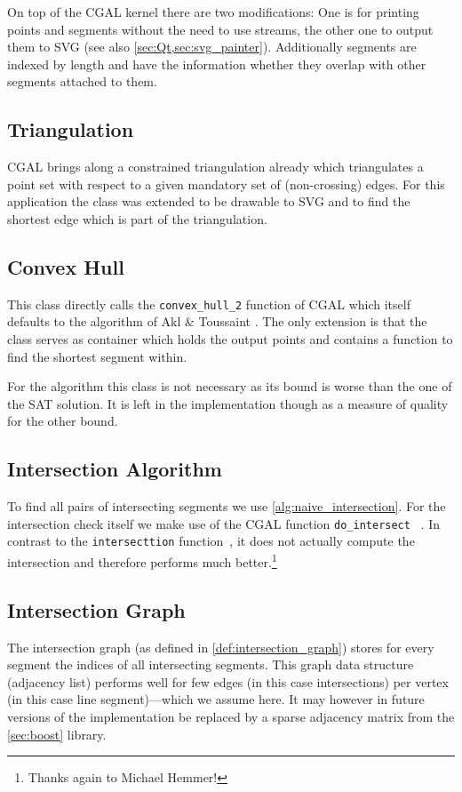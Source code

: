 On top of the \gls{CGAL} kernel there are two modifications: One is for
printing points and segments without the need to use streams, the
other one to output them to SVG (see also
\cref{sec:Qt,sec:svg_painter}). Additionally segments are indexed by
length and have the information whether they overlap with other
segments attached to them.

\subsection{Triangulation}
\gls{CGAL} brings along a constrained triangulation already
\cite{cgal_manual_constrained_triangulation}
which triangulates a point set with respect to a given mandatory set
of (non-crossing) edges. For this application the class was extended
to be drawable to SVG and to find the shortest edge which is part of
the triangulation.

\subsection{Convex Hull}
This class directly calls the \verb|convex_hull_2| function of \gls{CGAL}
\cite{cgal_manual_convex_hull} which itself defaults to the algorithm
of Akl \& Toussaint \cite{convex_hull}. The only extension is that
the class serves as container
which holds the output points and contains a function to find the 
shortest segment within.

For the algorithm this class is not necessary as its bound is worse
than the one of the SAT solution. It is left in the implementation
though as a measure of quality for the other bound.

\subsection{Intersection Algorithm}
To find all pairs of intersecting segments we use 
\cref{alg:naive_intersection}. For the intersection check itself
we make use of the \gls{CGAL} function \verb|do_intersect|%
~\cite{cgal_manual_do_intersect}. In contrast to the
\verb|intersecttion| function~\cite{cgal_manual_intersection}, it
does not actually compute the intersection and therefore performs
much better.\footnote{Thanks again to Michael Hemmer!}

\subsection{Intersection Graph}
The intersection graph (as defined in \cref{def:intersection_graph})
stores for every segment the indices of all intersecting segments.
This graph data structure (adjacency list) performs well for few
edges (in this case intersections) per vertex (in this case line
segment)---which we assume here. It may however in future versions
of the implementation be replaced by a sparse adjacency matrix from
the \cref{sec:boost} library.

